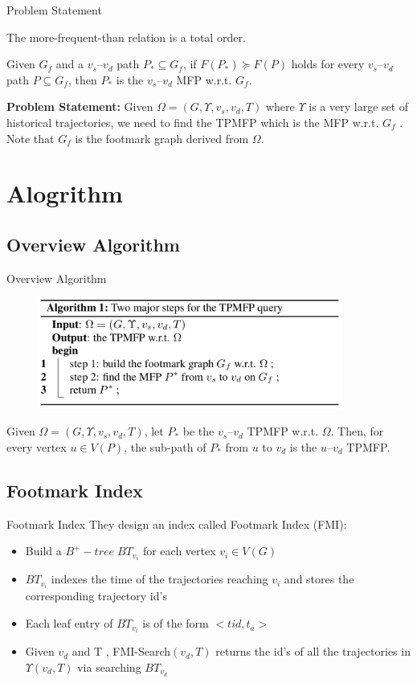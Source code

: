 \documentclass[mathserif]{beamer}
\begin{document}
\begin{frame}{Problem Statement}
\begin{theore}
The more-frequent-than relation is a total order.
\end{theore}
\begin{defination}[MPF]
Given $G_f$ and a $v_s–v_d$ path $P_* \subseteq{} G_f$, if $F(P_*) \succeq{} F(P)$ holds for every $v_s–v_d$ path $P \subseteq{} G_f$, then $P_*$ is the $v_s–v_d$ MFP w.r.t. $G_f$.
\end{defination}
\textbf{Problem Statement:} Given $\Omega{} = (G, \Upsilon{}, v_s, v_d, T )$ where $\Upsilon{}$ is a very large set of historical trajectories, we need to find the TPMFP which is the MFP w.r.t. $G_f$ . Note that $G_f$ is the footmark graph derived from $\Omega$.
\end{frame}

\section{Alogrithm}
\subsection{Overview Algorithm}

\begin{frame}{Overview Algorithm}
\begin{figure}
\includegraphics[width = 10cm]{alg1.png}
\end{figure}
\begin{theore}
Given $\Omega{} = (G, \Upsilon{}, v_s, v_d, T )$, let $P_*$ be the $v_s–v_d$ TPMFP w.r.t. $\Omega$. Then, for every vertex $u \in{} V (P )$, the sub-path of $P_*$ from $u$ to $v_d$ is the $u–v_d$ TPMFP.
\end{theore}
\end{frame}

\subsection[FMI]{Footmark Index}
\begin{frame}{Footmark Index}
They design an index called Footmark Index (FMI):
\begin{itemize}
\item Build a $B^+ - tree \; BT_{v_i}$ for each vertex $v_i \in{} V (G)$
\item $BT_{v_i}$ indexes the time of the trajectories reaching $v_i$ and stores the corresponding trajectory id’s
\item Each leaf entry of $BT_{v_i}$ is of the form $<tid,t_a>$
\item Given $v_d$ and T , FMI-Search$(v_d , T )$ returns the id’s of all the trajectories in $\Upsilon{}(v_d,T )$ via searching $BT_{v_d}$
\end{itemize}
\end{frame}
\end{document}
